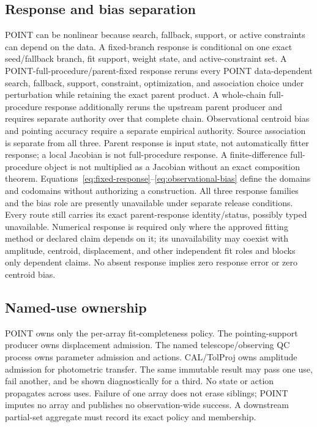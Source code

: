 \subsection{Response and bias separation}\label{sec:response}

POINT can be nonlinear because search, fallback, support, or active constraints
can depend on the data. A fixed-branch response is conditional on one exact
seed/fallback branch, fit support, weight state, and active-constraint set. A
POINT-full-procedure/parent-fixed response reruns every POINT data-dependent
search, fallback, support, constraint, optimization, and association choice
under perturbation while retaining the exact parent product. A whole-chain
full-procedure response additionally reruns the upstream parent producer and
requires separate authority over that complete chain. Observational
centroid bias and pointing accuracy require a separate empirical authority.
Source association is separate from all three. Parent response is input state,
not automatically fitter response; a local Jacobian is not full-procedure
response. A finite-difference full-procedure object is not multiplied as a
Jacobian without an exact composition theorem. Equations~\ref{eq:fixed-response}--\ref{eq:observational-bias}
define the domains and codomains without authorizing a construction. All three
response families and the bias role are presently unavailable under separate
release conditions. Every route still carries its exact parent-response
identity/status, possibly typed unavailable. Numerical response is required
only where the approved fitting method or declared claim depends on it; its
unavailability may coexist with amplitude, centroid, displacement, and other
independent fit roles and blocks only dependent claims. No absent response
implies zero response error or zero centroid bias.

\subsection{Named-use ownership}\label{sec:named-uses}

POINT owns only the per-array fit-completeness policy. The pointing-support
producer owns displacement admission. The named telescope/observing QC process
owns parameter admission and actions. CAL/TolProj owns amplitude admission for
photometric transfer. The same immutable result may pass one use, fail another,
and be shown diagnostically for a third. No state or action propagates across
uses. Failure of one array does not erase siblings; POINT imputes no array and
publishes no observation-wide success. A downstream partial-set aggregate
must record its exact policy and membership.

